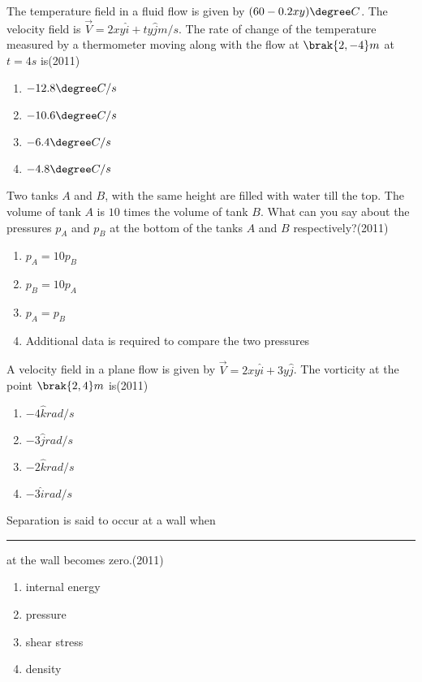 \item The temperature field in a fluid flow is given by $(60-0.2xy)\degree C$. The velocity field is $\overrightarrow{V}=2xy\hat{i}+ty\hat{j}m/s$. The rate of change of the temperature measured by a thermometer moving along with the flow at $\brak{2,-4}m$ at $t=4s$ is\hfill(2011)
\begin{multicols}{2}
\begin{enumerate}
\item $-12.8\degree C/s$
\item $-10.6\degree C/s$
\item $-6.4\degree C/s$
\item $-4.8\degree C/s$
\end{enumerate}
\end{multicols}


\item Two tanks $A$ and $B$, with the same height are filled with water till the top. The volume of tank $A$ is $10$ times the volume of tank $B$. What can you say about the pressures $p_{A}$ and $p_{B}$ at the bottom of the tanks $A$ and $B$ respectively?\hfill(2011)
\begin{enumerate}
\item $p_{A}=10p_{B}$
\item $p_{B}=10p_{A}$
\item $p_{A}=p_{B}$
\item Additional data is required to compare the two pressures
\end{enumerate}


\item A velocity field in a plane flow is given by $\overrightarrow{V}=2xy\hat{i}+3y\hat{j}$. The vorticity at the point $\brak{2,4}m$ is\hfill(2011)
\begin{multicols}{2}
\begin{enumerate}
\item $-4\hat{k}rad/s$
\item $-3\hat{j}rad/s$
\item $-2\hat{k}rad/s$
\item $-3\hat{i}rad/s$
\end{enumerate}
\end{multicols}


\item Separation is said to occur at a wall when \rule{1cm}{0.15mm} at the wall becomes zero.\hfill(2011)
\begin{multicols}{2}
\begin{enumerate}
\item internal energy
\item pressure
\item shear stress
\item density
\end{enumerate}
\end{multicols}